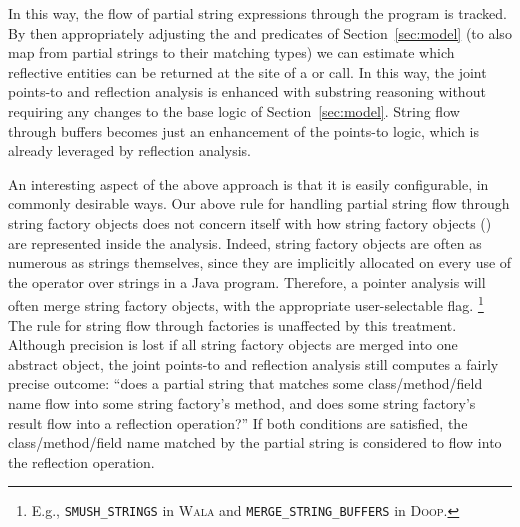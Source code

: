 In this way, the flow of partial string expressions through the
program is tracked. By then appropriately adjusting the
 and  predicates of
Section~\ref{sec:model} (to also map from partial strings to their
matching types) we can estimate which reflective entities can be
returned at the site of a  or  call.  In
this way, the joint points-to and reflection analysis is enhanced with
substring reasoning without requiring any changes to the base logic of
Section~\ref{sec:model}. String flow through buffers becomes just
an enhancement of the points-to logic, which is already leveraged
by reflection analysis.


An interesting aspect of the above approach is that it is easily
configurable, in commonly desirable ways. Our above rule for handling
partial string flow through string factory objects does not concern
itself with how string factory objects () are represented
inside the analysis. Indeed, string factory objects are often as
numerous as strings themselves, since they are implicitly allocated on
every use of the \code{+} operator over strings in a Java program.
Therefore, a pointer analysis will often merge string factory
objects, with the appropriate user-selectable flag.%
\footnote{E.g., 
  \texttt{SMUSH\_STRINGS} in \textsc{Wala} 
  \cite{www:wala-reflection} and \texttt{MERGE\_STRING\_BUFFERS} in
   \textsc{Doop}.}
The rule for string flow through
factories is unaffected by this treatment. Although precision is lost
if all string factory objects are merged into one abstract object, the
joint points-to and reflection analysis still computes a fairly
precise outcome: ``does a partial string that matches some
class/method/field name flow into some string factory's 
method, and does some string factory's  result flow into
a reflection operation?'' If both conditions are satisfied, the
class/method/field name matched by the partial string is considered to
flow into the reflection operation.

